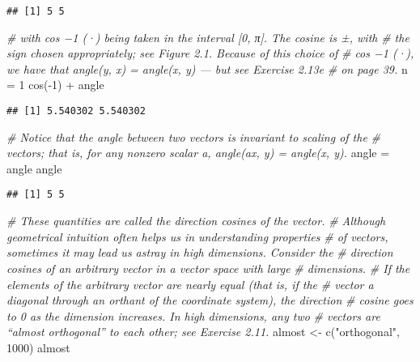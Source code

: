\documentclass[
]{article}
\newenvironment{Shaded}{\begin{snugshade}}{\end{snugshade}}
\newcommand{\CommentTok}[1]{\textcolor[rgb]{0.56,0.35,0.01}{\textit{#1}}}
\newcommand{\DecValTok}[1]{\textcolor[rgb]{0.00,0.00,0.81}{#1}}
\newcommand{\FunctionTok}[1]{\textcolor[rgb]{0.00,0.00,0.00}{#1}}
\newcommand{\NormalTok}[1]{#1}
\newcommand{\OtherTok}[1]{\textcolor[rgb]{0.56,0.35,0.01}{#1}}
\newcommand{\SpecialCharTok}[1]{\textcolor[rgb]{0.00,0.00,0.00}{#1}}
\newcommand{\StringTok}[1]{\textcolor[rgb]{0.31,0.60,0.02}{#1}}
\begin{document}
\begin{verbatim}
## [1] 5 5
\end{verbatim}

\begin{Shaded}
\begin{Highlighting}[]
\CommentTok{\# with cos −1 (·) being taken in the interval [0, π]. The cosine is ±, with}
\CommentTok{\# the sign chosen appropriately; see Figure 2.1. Because of this choice of }
\CommentTok{\# cos −1 (·), we have that angle(y, x) = angle(x, y) — but see Exercise 2.13e }
\CommentTok{\# on page 39.}
\NormalTok{n }\OtherTok{=} \DecValTok{1}
\FunctionTok{cos}\NormalTok{(}\SpecialCharTok{{-}}\DecValTok{1}\NormalTok{) }\SpecialCharTok{+}\NormalTok{ angle}
\end{Highlighting}
\end{Shaded}

\begin{verbatim}
## [1] 5.540302 5.540302
\end{verbatim}

\begin{Shaded}
\begin{Highlighting}[]
\CommentTok{\# Notice that the angle between two vectors is invariant to scaling of the}
\CommentTok{\# vectors; that is, for any nonzero scalar a, angle(ax, y) = angle(x, y).}
\NormalTok{angle }\OtherTok{=}\NormalTok{ angle}
\NormalTok{angle}
\end{Highlighting}
\end{Shaded}

\begin{verbatim}
## [1] 5 5
\end{verbatim}

\begin{Shaded}
\begin{Highlighting}[]
\CommentTok{\# These quantities are called the direction cosines of the vector.}
\CommentTok{\# Although geometrical intuition often helps us in understanding properties}
\CommentTok{\# of vectors, sometimes it may lead us astray in high dimensions. Consider the}
\CommentTok{\# direction cosines of an arbitrary vector in a vector space with large }
\CommentTok{\# dimensions.}
\CommentTok{\# If the elements of the arbitrary vector are nearly equal (that is, if the }
\CommentTok{\# vector a diagonal through an orthant of the coordinate system), the direction }
\CommentTok{\# cosine goes to 0 as the dimension increases. In high dimensions, any two }
\CommentTok{\# vectors are “almost orthogonal” to each other; see Exercise 2.11.}
\NormalTok{almost }\OtherTok{\textless{}{-}} \FunctionTok{c}\NormalTok{(}\StringTok{"orthogonal"}\NormalTok{, }\DecValTok{1000}\NormalTok{)}
\NormalTok{almost}
\end{Highlighting}
\end{Shaded}
\end{document}
